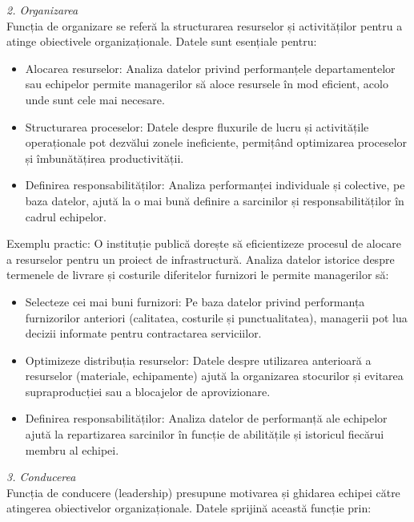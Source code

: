 \documentclass[
  11pt,
  b5paper,
  nottoc]{book}
\providecommand{\tightlist}{%
  \setlength{\itemsep}{0pt}\setlength{\parskip}{0pt}}\usepackage{longtable,booktabs,array}
\begin{document}
\emph{2. Organizarea}\\
Funcția de organizare se referă la structurarea resurselor și
activităților pentru a atinge obiectivele organizaționale. Datele sunt
esențiale pentru:

\begin{itemize}
\item
  Alocarea resurselor: Analiza datelor privind performanțele
  departamentelor sau echipelor permite managerilor să aloce resursele
  în mod eficient, acolo unde sunt cele mai necesare.
\item
  Structurarea proceselor: Datele despre fluxurile de lucru și
  activitățile operaționale pot dezvălui zonele ineficiente, permițând
  optimizarea proceselor și îmbunătățirea productivității.
\item
  Definirea responsabilităților: Analiza performanței individuale și
  colective, pe baza datelor, ajută la o mai bună definire a sarcinilor
  și responsabilităților în cadrul echipelor.
\end{itemize}

Exemplu practic: O instituție publică dorește să eficientizeze procesul
de alocare a resurselor pentru un proiect de infrastructură. Analiza
datelor istorice despre termenele de livrare și costurile diferitelor
furnizori le permite managerilor să:

\begin{itemize}
\tightlist
\item
  Selecteze cei mai buni furnizori: Pe baza datelor privind performanța
  furnizorilor anteriori (calitatea, costurile și punctualitatea),
  managerii pot lua decizii informate pentru contractarea serviciilor.\\
\item
  Optimizeze distribuția resurselor: Datele despre utilizarea anterioară
  a resurselor (materiale, echipamente) ajută la organizarea stocurilor
  și evitarea supraproducției sau a blocajelor de aprovizionare.\\
\item
  Definirea responsabilităților: Analiza datelor de performanță ale
  echipelor ajută la repartizarea sarcinilor în funcție de abilitățile
  și istoricul fiecărui membru al echipei.
\end{itemize}

\emph{3. Conducerea}\\
Funcția de conducere (leadership) presupune motivarea și ghidarea
echipei către atingerea obiectivelor organizaționale. Datele sprijină
această funcție prin:
\end{document}
